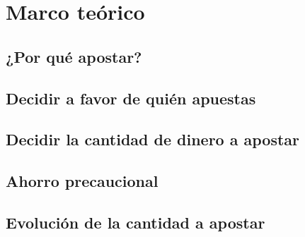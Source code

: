 \chapter{Marco teórico}
\section{¿Por qué apostar?}
\section{Decidir a favor de quién apuestas}
\section{Decidir la cantidad de dinero a apostar}
\section{Ahorro precaucional}
\section{Evolución de la cantidad a apostar}


